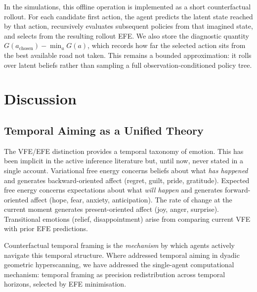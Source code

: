 \documentclass[11pt,a4paper]{article}
\begin{document}
In the simulations, this offline operation is implemented as a short counterfactual rollout. For each candidate first action, the agent predicts the latent state reached by that action, recursively evaluates subsequent policies from that imagined state, and selects from the resulting rollout EFE. We also store the diagnostic quantity $G(a_{\text{chosen}}) - \min_a G(a)$, which records how far the selected action sits from the best available road not taken. This remains a bounded approximation: it rolls over latent beliefs rather than sampling a full observation-conditioned policy tree.



\section{Discussion}\label{sec:discussion}

\subsection{Temporal Aiming as a Unified Theory}\label{sec:unified_theory}

The VFE/EFE distinction provides a temporal taxonomy of emotion. This has been implicit in the active inference literature but, until now, never stated in a single account. Variational free energy concerns beliefs about what \emph{has happened} and generates backward-oriented affect (regret, guilt, pride, gratitude). Expected free energy concerns expectations about what \emph{will happen} and generates forward-oriented affect (hope, fear, anxiety, anticipation). The rate of change at the current moment generates present-oriented affect (joy, anger, surprise). Transitional emotions (relief, disappointment) arise from comparing current VFE with prior EFE predictions.

Counterfactual temporal framing is the \emph{mechanism} by which agents actively navigate this temporal structure. Where \citet{hinrichs2025temporal} addressed temporal aiming in dyadic geometric hyperscanning, we have addressed the single-agent computational mechanism: temporal framing as precision redistribution across temporal horizons, selected by EFE minimisation.
\end{document}
